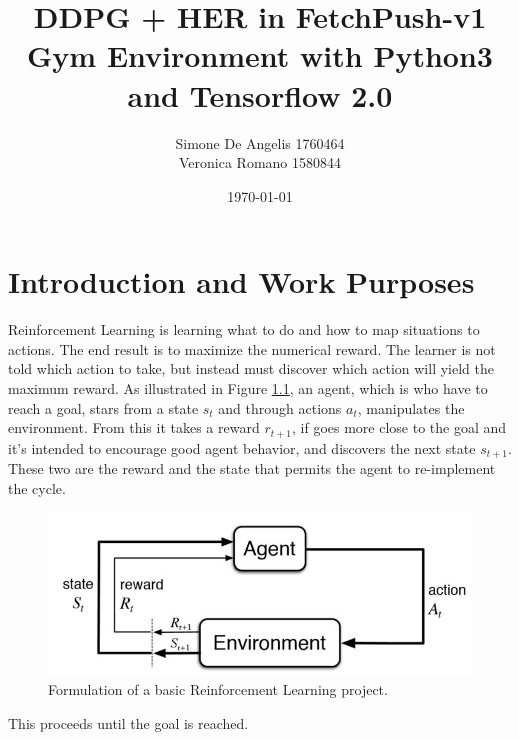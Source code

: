 \documentclass[a4paper]{report}
\title{DDPG + HER in FetchPush-v1 Gym Environment with Python3 and Tensorflow 2.0}
\author{Simone De Angelis 1760464\\ Veronica Romano 1580844}
\date{\today}
\begin{document}
\maketitle

\chapter{Introduction and Work Purposes}
Reinforcement Learning is learning what to do and how to map situations to actions. The end result is to maximize the numerical reward. The learner is not told which action to take, but instead must discover which action will yield the maximum reward. As illustrated in Figure \ref{Fig: scheme}, an agent, which is who have to reach a goal, stars from a state $s_t$ and through actions $a_t$, manipulates the environment. From this it takes a reward $r_{t+1}$, if goes more close to the goal and it's intended to encourage good agent behavior, and discovers the next state $s_{t+1}$. These two are the reward and the state that permits the agent to re-implement the cycle. 

\begin{figure}[h!]
\centering
\includegraphics[scale=0.5]{reinforcement.jpg}
\caption{\label{Fig: scheme} Formulation of a basic Reinforcement Learning project.}
\end{figure}

This proceeds until the goal is reached. 

\end{document}
